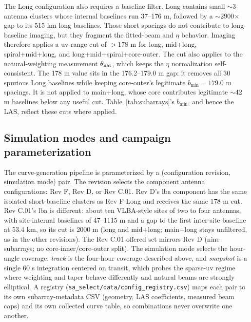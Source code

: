 \documentclass[11pt]{article}
\begin{document}
The Long configuration also requires a baseline filter.  Long contains small
$\sim$3-antenna clusters whose internal baselines run 37--176 m, followed by
a $\sim$2900$\times$ gap to its 515 km long baselines.  Those short spacings
do not contribute to long-baseline imaging, but they fragment the
fitted-beam and $\eta$ behavior.  Imaging therefore applies a uv-range cut
of $>178$ m for long, mid+long, spiral+mid+long, and
long+mid+spiral+core-outer.  The cut also applies to the
natural-weighting measurement $\theta_{\rm nat}$, which
keeps the $\eta$ normalization self-consistent.  The 178 m value
sits in the 176.2--179.0 m gap: it removes all 30 spurious Long baselines
while keeping core-outer's legitimate $b_{\min}=179.0$ m spacings.  It is
not applied to main+long, whose core contributes legitimate $\sim$42 m
baselines below any useful cut.  Table~\ref{tab:subarrays}'s $b_{\min}$, and
hence the LAS, reflect these cuts where applied.

\subsection{Simulation modes and campaign parameterization}
\label{sec:campaigns}

The curve-generation pipeline is parameterized by a (configuration
revision, simulation mode) pair.  The revision selects the component
antenna configurations: Rev F, Rev D, or Rev C.01.  Rev D's lba component
has the same isolated short-baseline clusters as Rev F Long and receives
the same 178 m cut.  Rev C.01's lba is different: about ten VLBA-style
sites of two to four antennas, with site-internal baselines of 47--1115 m
and a gap to the first inter-site baseline at 53.4 km, so its cut is
2000 m (long and mid+long; main+long stays unfiltered, as in the other
revisions).  The Rev C.01 offered set mirrors Rev D (nine subarrays; no
core-inner/core-outer split).  The simulation mode selects the hour-angle
coverage: \emph{track} is the four-hour coverage described above, and
\emph{snapshot} is a single 60 s integration centered on transit, which
probes the sparse-uv regime where weighting and taper behave differently
and natural beams are strongly elliptical.  A registry
(\texttt{sa\_select/data/config\_registry.csv}) maps each pair to its own
subarray-metadata CSV (geometry, LAS coefficients, measured beam caps) and
its own collected curve table, so combinations never overwrite one
another.
\end{document}
